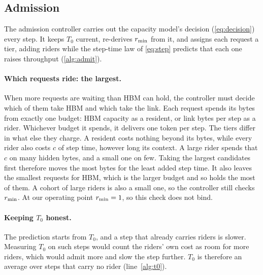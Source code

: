 
\subsection{Admission}\label{sec:admission}

The admission controller carries out the capacity model's decision
(\cref{eq:decision}) every step. It keeps $T_0$ current, re-derives $r_{\min}$
from it, and assigns each request a tier, adding riders while the step-time
law of \cref{eq:step} predicts that each one raises throughput
(\cref{alg:admit}).

\paragraph{Which requests ride: the largest.} When more requests are waiting
than HBM can hold, the controller must decide which of them take HBM and which
take the link. Each request spends its bytes from exactly one budget: HBM
capacity as a resident, or link bytes per step as a rider. Whichever budget it
spends, it delivers one token per step. The tiers differ in what else they charge. A resident costs
nothing beyond its bytes, while every rider also costs $c$ of step time,
however long its context. A large rider spends that $c$ on many hidden bytes,
and a small one on few. Taking the largest candidates first therefore
moves the most bytes for the least added step time. It also leaves the smallest
requests for HBM, which is the larger budget and so holds the most of them. A
cohort of large riders is also a small one, so the controller still checks
$r_{\min}$. At our operating point $r_{\min} = 1$, so this check does not bind.

\paragraph{Keeping $T_0$ honest.} The prediction starts from $T_0$, and a step
that already carries riders is slower. Measuring $T_0$ on such steps would
count the riders' own cost as room for more riders, which would admit more
and slow the step further. $T_0$
is therefore an average over steps that carry no rider (line~\ref{alg:t0}).


